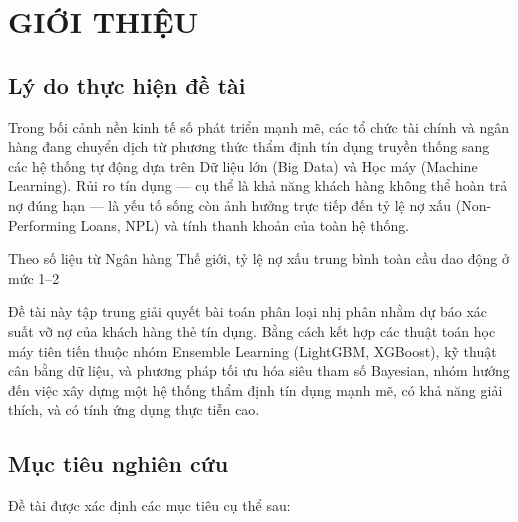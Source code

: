 \chapter{GIỚI THIỆU}

\section{Lý do thực hiện đề tài}

Trong bối cảnh nền kinh tế số phát triển mạnh mẽ, các tổ chức tài chính và ngân hàng đang chuyển dịch từ phương thức thẩm định tín dụng truyền thống sang các hệ thống tự động dựa trên Dữ liệu lớn (Big Data) và Học máy (Machine Learning). Rủi ro tín dụng — cụ thể là khả năng khách hàng không thể hoàn trả nợ đúng hạn — là yếu tố sống còn ảnh hưởng trực tiếp đến tỷ lệ nợ xấu (Non-Performing Loans, NPL) và tính thanh khoản của toàn hệ thống.

Theo số liệu từ Ngân hàng Thế giới, tỷ lệ nợ xấu trung bình toàn cầu dao động ở mức 1–2%

Đề tài này tập trung giải quyết bài toán phân loại nhị phân nhằm dự báo xác suất vỡ nợ của khách hàng thẻ tín dụng. Bằng cách kết hợp các thuật toán học máy tiên tiến thuộc nhóm Ensemble Learning (LightGBM, XGBoost), kỹ thuật cân bằng dữ liệu, và phương pháp tối ưu hóa siêu tham số Bayesian, nhóm hướng đến việc xây dựng một hệ thống thẩm định tín dụng mạnh mẽ, có khả năng giải thích, và có tính ứng dụng thực tiễn cao.

\section{Mục tiêu nghiên cứu}

Đề tài được xác định các mục tiêu cụ thể sau:

